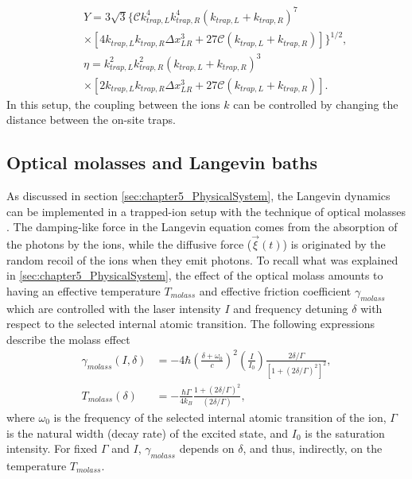 %
\begin{eqnarray}
&&Y = 3 \sqrt{3} \bigg\{\mathcal{C} k_{trap,L}^4 k_{trap,R}^4 \left(k_{trap,L}+k_{trap,R}\right)^{7}
\nonumber\\
&&\times\left[4 k_{trap,L} k_{trap,R} \Delta x_{LR}^3+27 \mathcal{C} \left(k_{trap,L}+k_{trap,R}\!\right)\!\right]\!\!\bigg\}^{\!1/2}\!,
\nonumber
%
\\
&&\eta =  k_{trap,L}^2 k_{trap,R}^2 \left(k_{trap,L}+k_{trap,R}\right)^{3}
\nonumber\\
&&\times\left[2 k_{trap,L} k_{trap,R} \Delta x_{LR}^3+27 \mathcal{C} \left(k_{trap,L}+k_{trap,R}\right)\right]\!.
\end{eqnarray}
%
In this setup, the coupling between the ions $k$ can be controlled by changing the distance between the on-site traps.
%
%
%
\subsection{Optical molasses and Langevin baths}
%
%
%
As discussed in section \ref{sec:chapter5_PhysicalSystem}, the Langevin dynamics can be implemented in a trapped-ion setup with the technique of optical molasses \cite{Chu1985,Cohen1992,Metcalf1999,Metcalf2003}. The damping-like force in the Langevin equation comes from the absorption of the photons by the ions, while the diffusive force ($\overrightarrow{\xi}(t)$) is originated by the random recoil of the ions when they emit photons. To recall what was explained in \ref{sec:chapter5_PhysicalSystem}, the effect of the optical molass amounts to having an effective temperature $T_{molass}$ and effective friction coefficient $\gamma_{molass}$ which are controlled with the laser intensity $I$ and frequency detuning $\delta$ with respect to the selected internal atomic transition. The following expressions describe the molass effect \cite{Cohen1992,Metcalf2003,Ruiz2014}
%
\begin{align}
  \gamma_{molass}(I,\delta) &= -4 \hbar \left(\frac{\delta + \omega_0}{c}\right)^2 \left(\frac{I}{I_0}\right)\frac{2\delta/\Gamma}{\left[1 + (2\delta/\Gamma)^2\right]^2},\nonumber\\
  T_{molass}(\delta) &= -\frac{\hbar \Gamma}{4 k_B} \frac{1+(2\delta/\Gamma)^2}{(2\delta/\Gamma)},
  \label{eq:chapter6_DopplerCoolingToyModel}
\end{align}
%
where $\omega_0$ is the frequency of the selected internal atomic transition of the ion, $\Gamma$ is the natural width (decay rate) of the excited state, and $I_0$ is the saturation intensity. For fixed $\Gamma$ and $I$, $\gamma_{molass}$ depends on $\delta$, and thus, indirectly, on the temperature $T_{molass}$.
%
%
%

